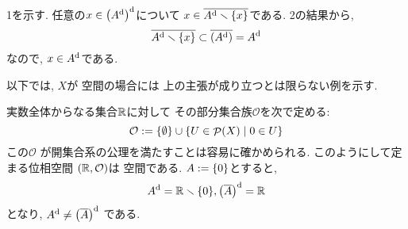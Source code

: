 \documentclass[uplatex, dvipdfmx, a4paper, 12pt, class=jsarticle, crop=false]{standalone}
\begin{document}
	1を示す.
	任意の\( x \in \lrparen{A^\topd}^\topd \)について
	\( x \in \topbar{A^\topd \setminus \lrbrace{x}} \)である.
	2の結果から,
	\[ \topbar{A^\topd \setminus \lrbrace{x}}
	\subset \topbar{\lrparen{A^\topd}} = A^\topd \]
	なので, \( x \in A^{\mathrm{d}} \)である.

	以下では, \( X \)が  空間の場合には
	上の主張が成り立つとは限らない例を示す.

	実数全体からなる集合\( \mathbb{R} \)に対して
	その部分集合族\( \mathcal{O} \)を次で定める:
	\[ \mathcal{O} \defeq \lrbrace{\emptyset}
	\cup \setcomp{U \in \pow(X)}
	{0 \in U} \]
	この\( \mathcal{O} \)
	が開集合系の公理を満たすことは容易に確かめられる.
	このようにして定まる位相空間
	\( (\mathbb{R}, \mathcal{O}) \)は  空間である.
	\( A \defeq \lrbrace{0} \)とすると,
	\[A^\topd = \R \setminus \lrbrace{0},
	\lrparen{\topbar{A}}^\topd = \R\]
	となり,
	\( A^\topd \neq \lrparen{\topbar{A}}^\topd \)
	である.
\end{document}
